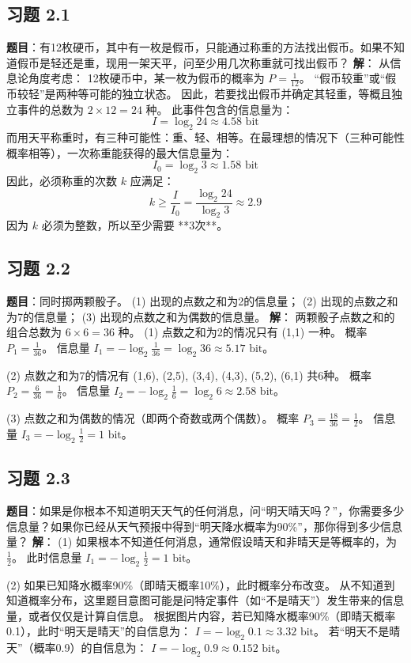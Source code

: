 \documentclass[11pt, a4paper]{article}
\begin{document}
\subsection*{习题 2.1}
\textbf{题目}：有12枚硬币，其中有一枚是假币，只能通过称重的方法找出假币。如果不知道假币是轻还是重，现用一架天平，问至少用几次称重就可找出假币？
\textbf{解}：
从信息论角度考虑：
12枚硬币中，某一枚为假币的概率为 $P = \frac{1}{12}$。
“假币较重”或“假币较轻”是两种等可能的独立状态。
因此，若要找出假币并确定其轻重，等概且独立事件的总数为 $2 \times 12 = 24$ 种。
此事件包含的信息量为：
\[ I = \log_2 24 \approx 4.58 \text{ bit} \]
而用天平称重时，有三种可能性：重、轻、相等。在最理想的情况下（三种可能性概率相等），一次称重能获得的最大信息量为：
\[ I_0 = \log_2 3 \approx 1.58 \text{ bit} \]
因此，必须称重的次数 $k$ 应满足：
\[ k \ge \frac{I}{I_0} = \frac{\log_2 24}{\log_2 3} \approx 2.9 \]
因为 $k$ 必须为整数，所以至少需要 **3次**。

\subsection*{习题 2.2}
\textbf{题目}：同时掷两颗骰子。
(1) 出现的点数之和为2的信息量；
(2) 出现的点数之和为7的信息量；
(3) 出现的点数之和为偶数的信息量。
\textbf{解}：
两颗骰子点数之和的组合总数为 $6 \times 6 = 36$ 种。
(1) 点数之和为2的情况只有 (1,1) 一种。
概率 $P_1 = \frac{1}{36}$。
信息量 $I_1 = -\log_2 \frac{1}{36} = \log_2 36 \approx 5.17 \text{ bit}$。

(2) 点数之和为7的情况有 (1,6), (2,5), (3,4), (4,3), (5,2), (6,1) 共6种。
概率 $P_2 = \frac{6}{36} = \frac{1}{6}$。
信息量 $I_2 = -\log_2 \frac{1}{6} = \log_2 6 \approx 2.58 \text{ bit}$。

(3) 点数之和为偶数的情况（即两个奇数或两个偶数）。
概率 $P_3 = \frac{18}{36} = \frac{1}{2}$。
信息量 $I_3 = -\log_2 \frac{1}{2} = 1 \text{ bit}$。

\subsection*{习题 2.3}
\textbf{题目}：如果是你根本不知道明天天气的任何消息，问“明天晴天吗？”，你需要多少信息量？如果你已经从天气预报中得到“明天降水概率为90\%”，那你得到多少信息量？
\textbf{解}：
(1) 如果根本不知道任何消息，通常假设晴天和非晴天是等概率的，为 $\frac{1}{2}$。
此时信息量 $I_1 = -\log_2 \frac{1}{2} = 1 \text{ bit}$。

(2) 如果已知降水概率90\%（即晴天概率10\%），此时概率分布改变。
从不知道到知道概率分布，这里题目意图可能是问特定事件（如“不是晴天”）发生带来的信息量，或者仅仅是计算自信息。
根据图片内容，若已知降水概率90\%（即晴天概率0.1），此时“明天是晴天”的自信息为：
$I = -\log_2 0.1 \approx 3.32 \text{ bit}$。
若“明天不是晴天”（概率0.9）的自信息为：
$I = -\log_2 0.9 \approx 0.152 \text{ bit}$。
\end{document}
